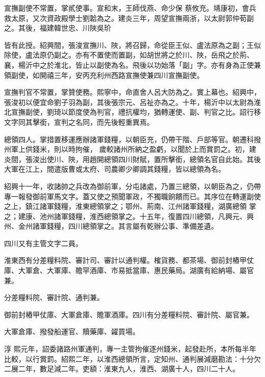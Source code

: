 \begin{pinyinscope}
 宣撫副使不常置，掌貳使事。宣和末，王師伐燕、命少保
 蔡攸充。靖康初，會兵救太原，又次資政殿學士劉韐為之。建炎三年，周望宣撫兩浙，以太尉郭仲荀副之。其後，福建韓世忠、川陜吳玠



 皆有此授。紹興間，張浚宣撫川、陜，將召歸，命從臣王似、盧法原為之副；王似除使，盧法原仍副之。亦有不置使而置副，如胡世將之於川、陜，岳飛之於荊、襄，楊沂中之於淮北，皆止以副使為名。飛後以功始落「副」字。亦有身為正使兼領副使，如開禧三年，安丙充利州西路宣撫使兼四川宣撫副使。



 宣撫判官不常置，掌贊使務。熙寧中，命直舍人呂大防為之。實上幕也。紹興中，張浚初以便宜命劉子羽為副，其後張宗元、呂祉亦為之。十年，楊沂中以太尉為淮北宣撫副使，劉琦以節度使為判官，禮抗權均，猶轉運使、副、判官之比。詔行移文字同其擊銜，宣判之名同，而先後輕重異焉。



 總領四人。掌措置移運應辦諸軍錢糧，以朝臣充，仍帶干階、戶部等官。朝遷科撥州軍上供錢米，則以時拘催，
 歲較諸州所納之盈虧，以聞於上而賞罰之。初，建炎間，張浚出使川、陜，用趙開總領四川財賦，置所擊銜，總領名官自此始。其後大軍在江上，間遣版曹或太府、司農卿少卿調其錢糧，皆以總領為名。



 紹興十一年，收諸帥之兵改為御前軍，分屯諸處，乃置三總領，以朝臣為之，仍帶專一報發御前軍馬文字。蓋又使之預聞軍政，不獨職餉饋而已。其序位在轉運副使之上，鎮江諸軍錢糧，淮東總領掌之；鄂州、荊南、江州諸軍錢糧，湖廣總領
 掌之；建康、池州諸軍錢糧，淮西總領掌之。十五年，復置四川總領，凡興元、興州、金州諸軍錢糧，四川總領掌之。其言屬有乾辦公事、準備差遺。



 四川又有主管文字二員。



 淮東西有分差糧料院、審計司、審計以通判權。榷貨務、都茶場、御前封樁甲仗庫、大軍倉、大軍庫、贍罕酒庫、市易抵當庫、惠民藥局。湖廣有給納場、屬官兼。



 分差糧料院、審計院、通判兼。



 御前封樁甲仗庫、大軍倉庫、贍軍酒庫。四川有分差糧料院、審計院、屬官兼。



 大軍倉庫、撥發船運官、贖藥庫、糴買場。



 淳
 熙元年，詔委諸路州軍通判，專一主管拘催逐州錢米，起發赴所，本所每半年比較，以行賞罰。紹熙二年，以淮西總領所言，定知州、通判展減磨勘法：十分欠二展二年，數足減二年。吏額：淮東九人，淮西、湖廣十人，四川二十人。




\end{pinyinscope}
